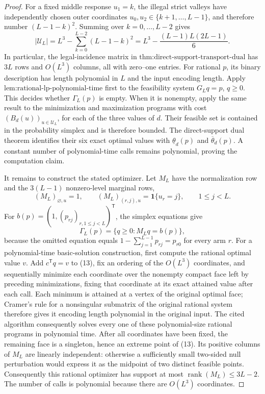 \documentclass{article}
\begin{document}
\begin{proof}
For a fixed middle response \(u_1=k\), the illegal strict valleys have independently chosen outer coordinates \(u_0,u_2\in\{k+1,\ldots,L-1\}\), and therefore number \((L-1-k)^2\).  Summing over \(k=0,\ldots,L-2\) gives
\[
 |\mathcal U_L|
 =L^3-\sum_{k=0}^{L-2}(L-1-k)^2
 =L^3-\frac{(L-1)L(2L-1)}6.
 \tag{12}
\]
In particular, the legal-incidence matrix in \(\text{thm:direct-support-transport-dual}\) has \(3L\) rows and \(O(L^3)\) columns, all with zero--one entries.  For rational \(p\), its binary description has length polynomial in \(L\) and the input encoding length.  Apply \(\text{lem:rational-lp-polynomial-time}\) first to the feasibility system \(G_Lq=p\), \(q\ge0\).  This decides whether \(\Gamma_L(p)\) is empty.  When it is nonempty, apply the same result to the minimization and maximization programs with cost \((B_d(u))_{u\in\mathcal U_L}\), for each of the three values of \(d\).  Their feasible set is contained in the probability simplex and is therefore bounded.  The direct-support dual theorem identifies their six exact optimal values with \(\underline\theta_d(p)\) and \(\overline\theta_d(p)\).  A constant number of polynomial-time calls remains polynomial, proving the computation claim.

It remains to construct the stated optimizer.  Let \(M_L\) have the normalization row and the \(3(L-1)\) nonzero-level marginal rows,
\[
 (M_L)_{\varnothing,u}=1,
 \qquad
 (M_L)_{(r,j),u}=\mathbf 1\{u_r=j\},
 \qquad 1\le j<L.
\]
For \(b(p)=(1,(p_{rj})_{r,1\le j<L})^{\mathsf T}\), the simplex equations give
\[
 \Gamma_L(p)=\{q\ge0:M_Lq=b(p)\},
 \tag{13}
\]
because the omitted equation equals \(1-\sum_{j=1}^{L-1}p_{rj}=p_{r0}\) for every arm \(r\).  For a polynomial-time basic-solution construction, first compute the rational optimal value \(v\).  Add \(c^{\mathsf T}q=v\) to (13), fix an ordering of the \(O(L^3)\) coordinates, and sequentially minimize each coordinate over the nonempty compact face left by preceding minimizations, fixing that coordinate at its exact attained value after each call.  Each minimum is attained at a vertex of the original optimal face; Cramer's rule for a nonsingular submatrix of the original rational system therefore gives it encoding length polynomial in the original input.  The cited algorithm consequently solves every one of these polynomial-size rational programs in polynomial time.  After all coordinates have been fixed, the remaining face is a singleton, hence an extreme point of (13).  Its positive columns of \(M_L\) are linearly independent: otherwise a sufficiently small two-sided null perturbation would express it as the midpoint of two distinct feasible points.  Consequently this rational optimizer has support at most \(\operatorname{rank}(M_L)\le3L-2\).  The number of calls is polynomial because there are \(O(L^3)\) coordinates.


\end{proof}
\end{document}
